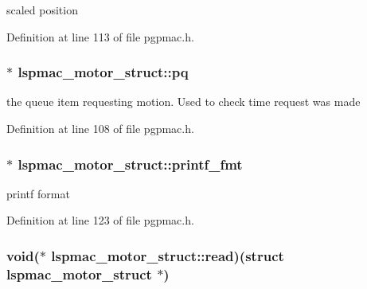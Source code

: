 scaled position 



Definition at line 113 of file pgpmac.\-h.

\hypertarget{structlspmac__motor__struct_a8caf0031e134e144bffc87d9d896d15b}{
\subsubsection[{pq}]{$\ast$ lspmac\-\_\-motor\-\_\-struct\-::pq}}\label{structlspmac__motor__struct_a8caf0031e134e144bffc87d9d896d15b}


the queue item requesting motion. Used to check time request was made 



Definition at line 108 of file pgpmac.\-h.

\hypertarget{structlspmac__motor__struct_a25b13b65baf1b28c34012850809b0a3a}{
\subsubsection[{printf\-\_\-fmt}]{$\ast$ lspmac\-\_\-motor\-\_\-struct\-::printf\-\_\-fmt}}\label{structlspmac__motor__struct_a25b13b65baf1b28c34012850809b0a3a}


printf format 



Definition at line 123 of file pgpmac.\-h.

\hypertarget{structlspmac__motor__struct_ac62692eb939c04ca35e939d1c3acfe8f}{
\subsubsection[{read}]{\setlength{\rightskip}{0pt plus 5cm}void($\ast$ lspmac\-\_\-motor\-\_\-struct\-::read)(struct {\bf lspmac\-\_\-motor\-\_\-struct} $\ast$)}}\label{structlspmac__motor__struct_ac62692eb939c04ca35e939d1c3acfe8f}


